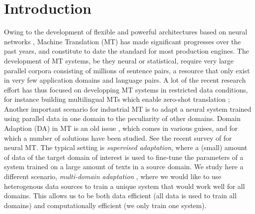 \documentclass[11pt,a4paper]{article}
\begin{document}
\section{Introduction \label{sec:introduction}}
Owing to the development of flexible and powerful architectures based on neural networks \cite{Cho14properties,Bahdanau15learning,Ghering17convolutional,Vaswani17attention}, Machine Translation (MT) has made significant progresses over the past years, and constitute to date the standard for most production engines. The development of MT systems, be they neural or statistical, require very large parallel corpora consisting of millions of sentence pairs, a resource that only exist in very few application domains and language pairs. A lot of the recent research effort has thus focused on developping MT systems in restricted data conditions, for instance building multilingual MTs which enable zero-shot translation \cite{Firat16multiway,Ha16towards,Johnson17google}; %
Another important scenario for industrial MT is to adapt a neural system trained using parallel data in one domain to the peculiarity of other domains. Domain Adaption (DA) in MT is an old issue \cite{Foster07mixture,Axelrod11domain}, which comes in various guises, and for which a number of solutions have been studied. See the recent survey of \cite{Chu18asurvey} for neural MT. The typical setting is \emph{supervised adaptation}, where a (small) amount of data of the target domain of interest is used to fine-tune the parameters of a system trained on a large amount of texts in a source domain. We study here a different scenario, \emph{multi-domain adaptation} \cite{Sennrich13multidomain,Farajian17multidomain}, where we would like to use heterogenous data sources to train a unique system that would work well for all domains. This allows us to be both data efficient (all data is used to train all domains) and computationally efficient (we only train one system). %
\end{document}
